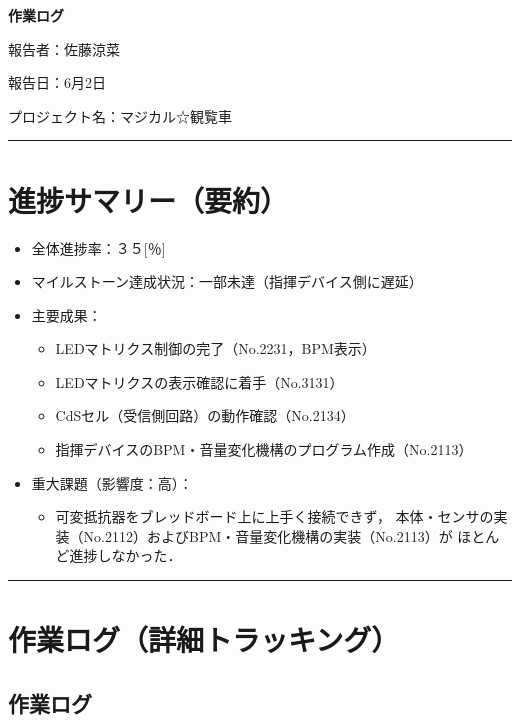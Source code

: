 \documentclass[uplatex,dvipdfmx,a4paper,11pt]{jsarticle}
\newcommand{\sectionrule}{\par\medskip\noindent\rule{\linewidth}{0.6pt}\par\medskip}
\begin{document}
{\LARGE\bfseries 作業ログ}\par\bigskip

報告者：佐藤涼菜

報告日：6月2日

プロジェクト名：マジカル☆観覧車

\sectionrule


\section{進捗サマリー（要約）}

\begin{itemize}
  \item 全体進捗率：３５[％]
  \item マイルストーン達成状況：一部未達（指揮デバイス側に遅延）
  \item 主要成果：
    \begin{itemize}
      \item {LEDマトリクス制御の完了（No.2231，BPM表示）}
      \item {LEDマトリクスの表示確認に着手（No.3131）}
      \item {CdSセル（受信側回路）の動作確認（No.2134）}
      \item {指揮デバイスのBPM・音量変化機構のプログラム作成（No.2113）}
    \end{itemize}
  \item 重大課題（影響度：高）：
    \begin{itemize}
      \item {可変抵抗器をブレッドボード上に上手く接続できず，
      本体・センサの実装（No.2112）およびBPM・音量変化機構の実装（No.2113）が
      ほとんど進捗しなかった．}
    \end{itemize}
\end{itemize}

\sectionrule


\section{作業ログ（詳細トラッキング）}

\subsection{作業ログ}

\renewcommand{\arraystretch}{1.2}

\small
\end{document}
